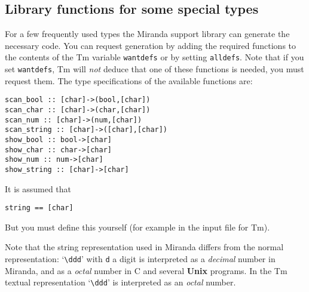 \documentclass{article}
\def\Tm{{\sf Tm}}
\def\C{{\sf C}}
\def\Unix{{\bf Unix}}
\def\Miranda{Miranda}
\begin{document}
\subsection{Library functions for some special types}
For a few frequently used types the {\Miranda} support library can generate
the necessary code.
You can request generation by adding the required functions to the contents
of the {\Tm} variable {\tt wantdefs} or by setting {\tt alldefs}.
Note that if you set {\tt wantdefs}, {\Tm} will {\em not} deduce that
one of these functions is needed, you must request them.
The type specifications of the available functions are:
\begin{verbatim}
scan_bool :: [char]->(bool,[char])
scan_char :: [char]->(char,[char])
scan_num :: [char]->(num,[char])
scan_string :: [char]->([char],[char])
show_bool :: bool->[char]
show_char :: char->[char]
show_num :: num->[char]
show_string :: [char]->[char]
\end{verbatim}
It is assumed that
\begin{verbatim}
string == [char]
\end{verbatim}
But you must define this yourself (for example in the input file for {\Tm}).
\par
Note that the string representation used in {\Miranda} differs from the normal
representation: `\verb!\ddd!' with {\tt d} a digit is interpreted as
a {\em decimal} number in {\Miranda}, and as a {\em octal} number in
{\C} and several {\Unix} programs.
In the {\Tm} textual representation `\verb!\ddd!' is interpreted as
an {\em octal} number.
\end{document}
